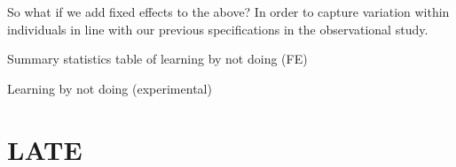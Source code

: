\documentclass[oneside,11pt]{article}
\begin{document}
So what if we add fixed effects to the above? In order to capture variation within individuals in line with our previous specifications in the observational study.




\begin{table}[H]
\caption{Summary statistics table of learning by not doing (FE)}
\begin{center}
\scriptsize{}
\end{center}
 \scriptsize

\end{table}

\begin{table}[H]
\caption{Learning by not doing (experimental)}
\begin{center}
\scriptsize{}
\end{center}
 \scriptsize

\end{table}





\section{LATE}

\begin{table}[H]
\caption{}
\label{tot_tut}
\begin{center}
\scriptsize{}
\end{center}
 \scriptsize
\end{table}
\end{document}
